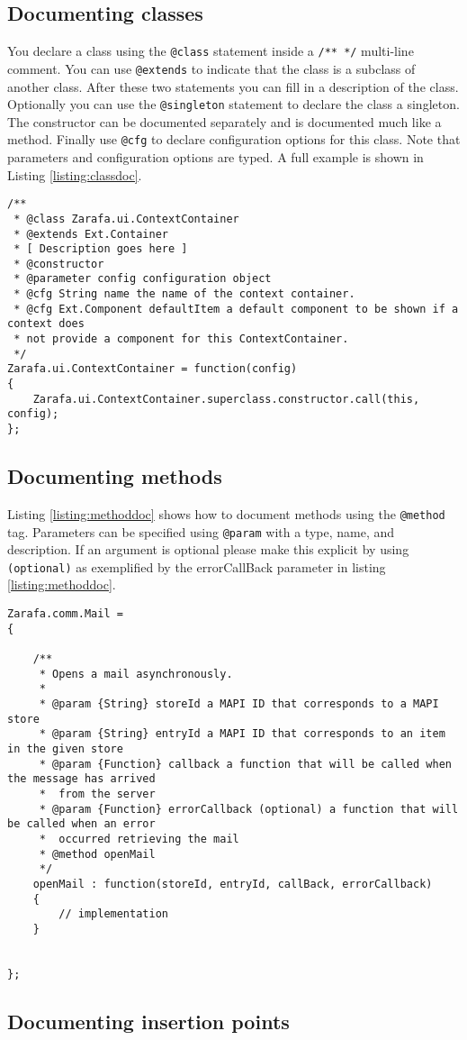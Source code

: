 \subsection{Documenting classes}

You declare a class using the {\tt @class} statement inside a {\tt /** */} multi-line comment. You can
use {\tt @extends} to indicate that the class is a subclass of another class. After these two statements
you can fill in a description of the class. Optionally you can use the {\tt @singleton} statement to declare 
the class a singleton. 
The constructor can be documented separately and is documented much like a method. Finally use {\tt @cfg}
to declare configuration options for this class. Note that parameters and configuration options are typed.
A full example is shown in Listing \ref{listing:classdoc}.

\begin{lstlisting}[caption={Declaring a new class}, label=listing:classdoc]
/**
 * @class Zarafa.ui.ContextContainer
 * @extends Ext.Container
 * [ Description goes here ]
 * @constructor
 * @parameter config configuration object
 * @cfg String name the name of the context container.
 * @cfg Ext.Component defaultItem a default component to be shown if a context does 
 * not provide a component for this ContextContainer. 
 */
Zarafa.ui.ContextContainer = function(config)
{
	Zarafa.ui.ContextContainer.superclass.constructor.call(this, config);
};
\end{lstlisting}

\subsection{Documenting methods}

Listing \ref{listing:methoddoc} shows how to document methods using the {\tt @method} tag. Parameters can be
specified using {\tt @param} with a type, name, and description. If an argument is optional please make
this explicit by using {\tt (optional)} as exemplified by the errorCallBack parameter in listing 
\ref{listing:methoddoc}.

\begin{lstlisting}[caption={Declaring a new class}, label=listing:methoddoc]
Zarafa.comm.Mail = 
{

	/**
	 * Opens a mail asynchronously.
	 * 
	 * @param {String} storeId a MAPI ID that corresponds to a MAPI store 
	 * @param {String} entryId a MAPI ID that corresponds to an item in the given store
	 * @param {Function} callback a function that will be called when the message has arrived 
	 *	from the server  
	 * @param {Function} errorCallback (optional) a function that will be called when an error 
	 *	occurred retrieving the mail
	 * @method openMail
	 */
	openMail : function(storeId, entryId, callBack, errorCallback)
	{
		// implementation
	}
	

};
\end{lstlisting}

\subsection{Documenting insertion points}
\label{section:docinsert}


